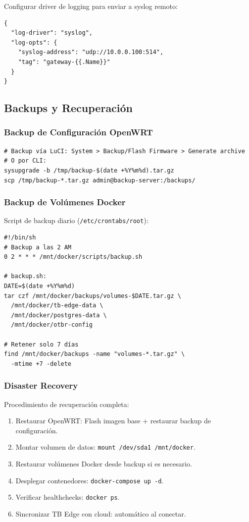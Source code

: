 Configurar driver de logging para enviar a syslog remoto:
\begin{verbatim}
{
  "log-driver": "syslog",
  "log-opts": {
    "syslog-address": "udp://10.0.0.100:514",
    "tag": "gateway-{{.Name}}"
  }
}
\end{verbatim}

\subsection{Backups y Recuperación}

\subsubsection{Backup de Configuración OpenWRT}

\begin{verbatim}
# Backup vía LuCI: System > Backup/Flash Firmware > Generate archive
# O por CLI:
sysupgrade -b /tmp/backup-$(date +%Y%m%d).tar.gz
scp /tmp/backup-*.tar.gz admin@backup-server:/backups/
\end{verbatim}

\subsubsection{Backup de Volúmenes Docker}

Script de backup diario (\texttt{/etc/crontabs/root}):
\begin{verbatim}
#!/bin/sh
# Backup a las 2 AM
0 2 * * * /mnt/docker/scripts/backup.sh

# backup.sh:
DATE=$(date +%Y%m%d)
tar czf /mnt/docker/backups/volumes-$DATE.tar.gz \
  /mnt/docker/tb-edge-data \
  /mnt/docker/postgres-data \
  /mnt/docker/otbr-config

# Retener solo 7 días
find /mnt/docker/backups -name "volumes-*.tar.gz" \
  -mtime +7 -delete
\end{verbatim}

\subsubsection{Disaster Recovery}

Procedimiento de recuperación completa:
\begin{enumerate}
    \item Restaurar OpenWRT: Flash imagen base + restaurar backup de configuración.
    \item Montar volumen de datos: \texttt{mount /dev/sda1 /mnt/docker}.
    \item Restaurar volúmenes Docker desde backup si es necesario.
    \item Desplegar contenedores: \texttt{docker-compose up -d}.
    \item Verificar healthchecks: \texttt{docker ps}.
    \item Sincronizar TB Edge con cloud: automático al conectar.
\end{enumerate}

